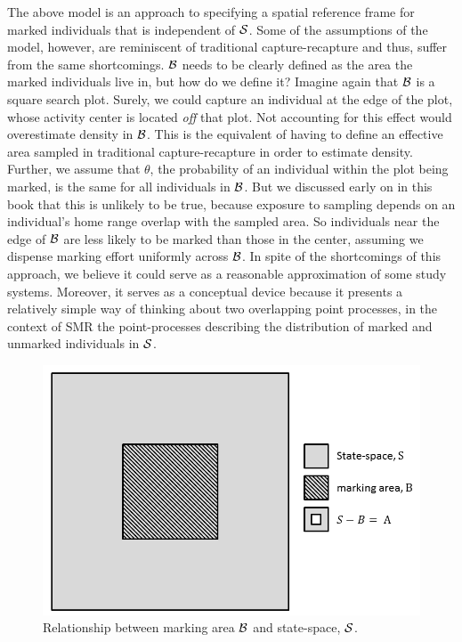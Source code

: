 The above
model is an approach to specifying a spatial reference frame for
marked individuals that is independent of ${\cal S}$.
Some of the assumptions of the model, however, are reminiscent of traditional capture-recapture and thus, suffer from the same shortcomings. ${\cal B}$ needs to be clearly defined as the area the marked individuals live in, but how do we define it? Imagine again that ${\cal B}$ is a square search plot. Surely, we could capture an individual at the edge of the plot, whose activity center is located \emph{off} that plot. Not accounting for this effect would overestimate density in ${\cal B}$. This is the equivalent of having to define an effective area sampled in traditional capture-recapture in order to estimate density. Further, we assume that $\theta$, the probability of an individual within the plot being marked, is the same for all individuals in ${\cal B}$. But we discussed early on in this book that this is unlikely to be true, because exposure to sampling depends on an individual's home range overlap with the sampled area. So individuals near the edge of ${\cal B}$ are less likely to be marked than those in the center, assuming we dispense marking effort uniformly across ${\cal B}$. In spite of the shortcomings of this approach, we believe it could serve as a reasonable approximation of some study systems. Moreover, it serves as a conceptual device because it presents a relatively simple way of thinking about two overlapping point processes, in the context of SMR the point-processes describing the distribution of marked and unmarked individuals in ${\cal S}$.


\begin{figure}[ht]
\begin{center}
\includegraphics[width=5in]{Ch19-PartialID/figs/scrPIDBox.png}
\end{center}
\caption{
Relationship between marking area ${\cal B}$ and state-space, ${\cal S}$.
}
\label{partialID.fig.Box}
\end{figure}

